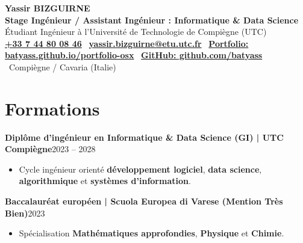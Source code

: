 \documentclass[10pt,a4paper]{article}
\newcommand{\entry}[2]{%
  \noindent\textbf{#1}\hfill{\small\textcolor{cvgrey}{#2}}\par\vspace{1pt}}
\begin{document}
\begin{center}
  {\LARGE\bfseries Yassir BIZGUIRNE}\\[0.18em]
  {\large\color{cvblue}\bfseries Stage Ingénieur / Assistant Ingénieur : Informatique \& Data Science}\\[0.12em]
  {\normalsize Étudiant Ingénieur à l'Université de Technologie de Compiègne (UTC)}\\[0.3em]
  {\small 
    \href{tel:+33744800846}{\textbf{+33 7 44 80 08 46}} 
    \textbullet\ \href{mailto:yassir.bizguirne@etu.utc.fr}{\textbf{yassir.bizguirne@etu.utc.fr}} 
    \textbullet\ \href{https://batyass.github.io/portfolio-osx/}{\textbf{Portfolio: batyass.github.io/portfolio-osx}} 
    \textbullet\ \href{https://github.com/batyass}{\textbf{GitHub: github.com/batyass}} 
    \textbullet\ Compiègne / Cavaria (Italie)
  }
\end{center}

\vspace{0.1em}

\section{Formations}

\entry{Diplôme d'ingénieur en Informatique \& Data Science (GI) | UTC Compiègne}{2023 -- 2028}
\begin{itemize}
  \item Cycle ingénieur orienté \textbf{développement logiciel}, \textbf{data science}, \textbf{algorithmique} et \textbf{systèmes d'information}.
\end{itemize}

\entry{Baccalauréat européen | Scuola Europea di Varese (Mention Très Bien)}{2023}
\begin{itemize}
  \item Spécialisation \textbf{Mathématiques approfondies}, \textbf{Physique} et \textbf{Chimie}.
\end{itemize}

\end{document}
